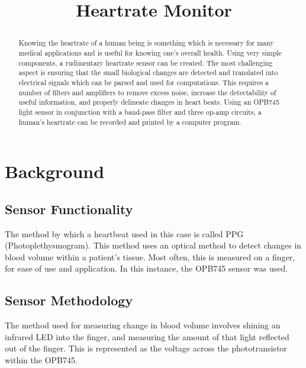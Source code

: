 \documentclass[conference]{IEEEtran}
\begin{document}
\title{Heartrate Monitor\\

\author{
\and
{}
}
}

\maketitle

\begin{abstract}
Knowing the heartrate of a human being is something which is
necessary for many medical applications and is useful for knowing
one's overall health. Using very simple components, a rudimentary
heartrate sensor can be created. The most challenging aspect is ensuring
that the small biological changes are detected and translated into
electrical signals which can be parsed and used for computations. This
requires a number of filters and amplifiers to remove excess noise,
increase the detectability of useful information, and properly delineate
changes in heart beats. Using an OPB745 light sensor in conjunction
with a band-pass filter and three op-amp circuits, a human's heartrate
can be recorded and printed by a computer program.
\end{abstract}

\section{Background}
\subsection{Sensor Functionality}
The method by which a heartbeat used in this case is called PPG
(Photoplethysmogram). This method uses an optical method to detect
changes in blood volume within a patient's tissue. Most often, this is
measured on a finger, for ease of use and application. In this instance,
the OPB745 sensor was used.

\subsection{Sensor Methodology}
The method used for measuring change in blood volume involves shining an
infrared LED into the finger, and measuring the amount of that light
reflected out of the finger. This is represented as the voltage across the
phototransistor within the OPB745.
\end{document}
